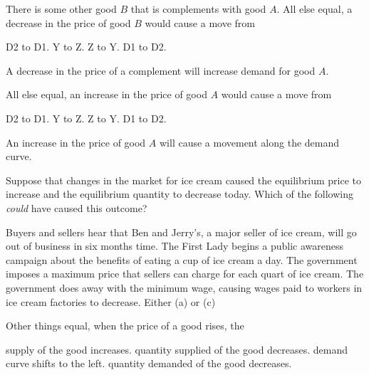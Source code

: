 \documentclass[addpoints,11pt]{exam}
\theoremstyle{definition}
\begin{document}
\begin{questions}
		
		\question \label{blah7} There is some other good $B$ that is complements with good $A$. All else equal, a decrease in the price of good $B$ would cause a move from  
		
		\begin{choices}
			\CorrectChoice D2 to D1.
			\choice Y to Z.
			\choice Z to Y.
			\choice D1 to D2.
		\end{choices}
		
		\begin{solution}
			A decrease in the price of a complement will increase demand for good $A$.
		\end{solution}
		
		
		\question \label{blah8} All else equal, an increase in the price of good $A$ would cause a move from
		
		\begin{choices}
			\choice D2 to D1.
			\CorrectChoice Y to Z.
			\choice Z to Y.
			\choice D1 to D2.
		\end{choices}
		
		\begin{solution}
			An increase in the price of good $A$ will cause a movement along the demand curve.
		\end{solution}
		

	

	\question Suppose that changes in the market for ice cream caused the equilibrium price to increase and the equilibrium quantity to decrease today. Which of the following \textit{could} have caused this outcome?
	
	\begin{choices}
		\CorrectChoice Buyers and sellers hear that Ben and Jerry's, a major seller of ice cream, will go out of business in six months time.
		\choice The First Lady begins a public awareness campaign about the benefits of eating a cup of ice cream a day.
		\choice The government imposes a maximum price that sellers can charge for each quart of ice cream.
		\choice The government does away with the minimum wage, causing wages paid to workers in ice cream factories to decrease.
		\choice Either (a) or (c)
	\end{choices}
	
\newpage
	
	
\question Other things equal, when the price of a good rises, the

\begin{choices}
	\choice supply of the good increases.
	\choice quantity supplied of the good decreases.
	\choice demand curve shifts to the left.
	\CorrectChoice quantity demanded of the good decreases.
\end{choices}


\end{questions}
\end{document}
